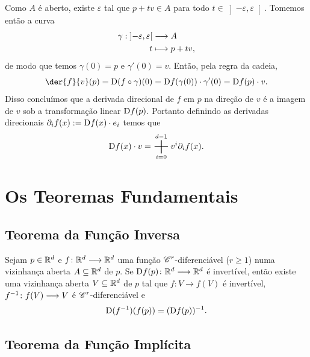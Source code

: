 Como $A$ é aberto, existe $\varepsilon$ tal que $p+tv \in A$ para todo $t \in \left]-\varepsilon,\varepsilon \right[$. Tomemos então a curva
	\begin{align*}
	{\gamma}: {\left]-\varepsilon,\varepsilon \right[} &\longrightarrow {A} \\{t} &\longmapsto {p+tv},
	\end{align*}
de modo que temos $\gamma(0)=p$ e $\gamma'(0) = v$. Então, pela regra da cadeia,
	\begin{equation*}
	 \der{f}{v}(p) = \D (f \circ \gamma)(0) = \D f(\gamma(0)) \cdot \gamma'(0) = \D f(p) \cdot v.
	\end{equation*}
Disso concluímos que a derivada direcional de $f$ em $p$ na direção de $v$ é a imagem de $v$ sob a transformação linear $\mathrm{D} f(p)$. Portanto definindo as derivadas direcionais $\partial_i f(x) := \mathrm{D} f(x) \cdot e_i$ temos que
	\begin{equation*}
	\D f(x) \cdot v = \sum_{i=0}^{d-1} v^i \partial_i f(x).
	\end{equation*}

\section{Os Teoremas Fundamentais}

\subsection{Teorema da Função Inversa}

\begin{prop}

Sejam $p \in \mathbb{R}^d$ e $f\colon \mathbb{R}^d \longrightarrow \mathbb{R}^d$ uma função $\mathscr{C}^r$-diferenciável ($r \geq 1$) numa vizinhança aberta $A \subseteq \mathbb{R}^d$ de $p$. Se $\mathrm{D} f(p)\colon \mathbb{R}^d \longrightarrow \mathbb{R}^d$ é invertível, então existe uma vizinhança aberta $V \subseteq \mathbb{R}^d$ de $p$ tal que $f\colon V \to f(V)$ é invertível, $f^{-1}\colon f(V) \longrightarrow V$ é $\mathscr{C}^r$-diferenciável e
	\begin{equation*}
	\mathrm{D}(f^{-1})(f(p)) = (\mathrm{D} f(p))^{-1}.
	\end{equation*}
\end{prop}

\subsection{Teorema da Função Implícita}

